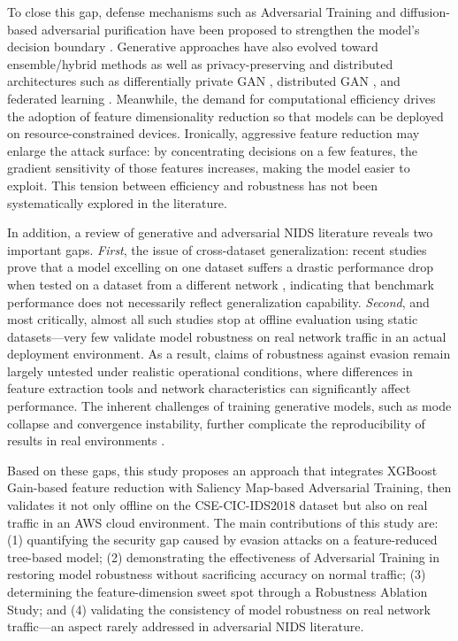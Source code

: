 \documentclass[11pt, a4paper]{article}
\begin{document}
To close this gap, defense mechanisms such as Adversarial Training and diffusion-based adversarial purification have been proposed to strengthen the model's decision boundary \citep{ref_diffpurif}. Generative approaches have also evolved toward ensemble/hybrid methods \citep{ref_ewgan, ref_hybridwgan} as well as privacy-preserving and distributed architectures such as differentially private GAN \citep{ref_hegan}, distributed GAN \citep{ref_distgan}, and federated learning \citep{ref_nidsfgpa}. Meanwhile, the demand for computational efficiency drives the adoption of feature dimensionality reduction so that models can be deployed on resource-constrained devices. Ironically, aggressive feature reduction may enlarge the attack surface: by concentrating decisions on a few features, the gradient sensitivity of those features increases, making the model easier to exploit. This tension between efficiency and robustness has not been systematically explored in the literature.

In addition, a review of generative and adversarial NIDS literature reveals two important gaps. \textit{First}, the issue of cross-dataset generalization: recent studies prove that a model excelling on one dataset suffers a drastic performance drop when tested on a dataset from a different network \citep{ref_crossgen, ref_synthtraffic}, indicating that benchmark performance does not necessarily reflect generalization capability. \textit{Second}, and most critically, almost all such studies stop at offline evaluation using static datasets---very few validate model robustness on real network traffic in an actual deployment environment. As a result, claims of robustness against evasion remain largely untested under realistic operational conditions, where differences in feature extraction tools and network characteristics can significantly affect performance. The inherent challenges of training generative models, such as mode collapse and convergence instability, further complicate the reproducibility of results in real environments \citep{ref_challenges}.

Based on these gaps, this study proposes an approach that integrates XGBoost Gain-based feature reduction with Saliency Map-based Adversarial Training, then validates it not only offline on the CSE-CIC-IDS2018 dataset but also on real traffic in an AWS cloud environment. The main contributions of this study are: (1) quantifying the security gap caused by evasion attacks on a feature-reduced tree-based model; (2) demonstrating the effectiveness of Adversarial Training in restoring model robustness without sacrificing accuracy on normal traffic; (3) determining the feature-dimension sweet spot through a Robustness Ablation Study; and (4) validating the consistency of model robustness on real network traffic---an aspect rarely addressed in adversarial NIDS literature.
\end{document}
